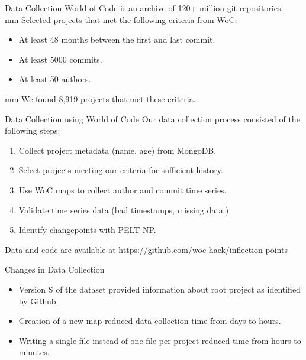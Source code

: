 \documentclass[11pt,handout]{beamer}
\begin{document}
\begin{frame}{Data Collection}
World of Code is an archive of 120+ million git repositories.\\
 mm
Selected projects that met the following criteria from WoC:
    \begin{itemize}
        \item At least 48 months between the first and last commit.
        \item At least 5000 commits.
        \item At least 50 authors.
    \end{itemize}
 mm
We found 8,919 projects that met these criteria.
\end{frame}

\begin{frame}{Data Collection using World of Code}
    Our data collection process consisted of the following steps:
    \begin{enumerate}
        \item Collect project metadata (name, age) from MongoDB.
        \item Select projects meeting our criteria for sufficient history.
        \item Use WoC maps to collect author and commit time series.
        \item Validate time series data (bad timestamps, missing data.)
        \item Identify changepoints with PELT-NP.
    \end{enumerate}
    \vskip 5mm
    Data and code are available at \url{https://github.com/woc-hack/inflection-points}
\end{frame}

\begin{frame}{Changes in Data Collection}
    \begin{itemize}
        \item Version S of the dataset provided information about root project as identified by Github.
        \item Creation of a new map reduced data collection time from days to hours.
        \item Writing a single file instead of one file per project reduced time from hours to minutes.
    \end{itemize}
\end{frame}
\end{document}
